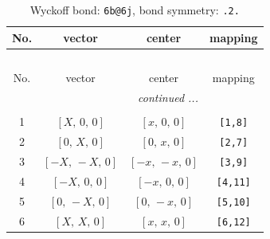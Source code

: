 \documentclass[fleqn,8pt]{jsarticle}
\begin{document}
\begin{longtable}{cccc}
\caption{Wyckoff bond: {\tt 6b@6j}, bond symmetry: {\tt .2.}}
 \\
 \hline \hline
No. & vector & center & mapping \\ \hline \endfirsthead

\multicolumn{3}{l}{\tablename\ \thetable{}} \\
 \hline \hline
No. & vector & center & mapping \\ \hline \endhead

 \hline \hline
\multicolumn{3}{r}{\footnotesize\it continued ...} \\ \endfoot

 \hline \hline
\multicolumn{3}{r}{} \\ \endlastfoot

1 & $\left[ X,\, 0,\, 0 \right]$ & $\left[ x,\, 0,\, 0 \right]$ & {\tt [1,8]} \\ \hline
2 & $\left[ 0,\, X,\, 0 \right]$ & $\left[ 0,\, x,\, 0 \right]$ & {\tt [2,7]} \\ \hline
3 & $\left[ - X,\, - X,\, 0 \right]$ & $\left[ - x,\, - x,\, 0 \right]$ & {\tt [3,9]} \\ \hline
4 & $\left[ - X,\, 0,\, 0 \right]$ & $\left[ - x,\, 0,\, 0 \right]$ & {\tt [4,11]} \\ \hline
5 & $\left[ 0,\, - X,\, 0 \right]$ & $\left[ 0,\, - x,\, 0 \right]$ & {\tt [5,10]} \\ \hline
6 & $\left[ X,\, X,\, 0 \right]$ & $\left[ x,\, x,\, 0 \right]$ & {\tt [6,12]} \\
\end{longtable}
\renewcommand{\arraystretch}{1.2}
\end{document}
